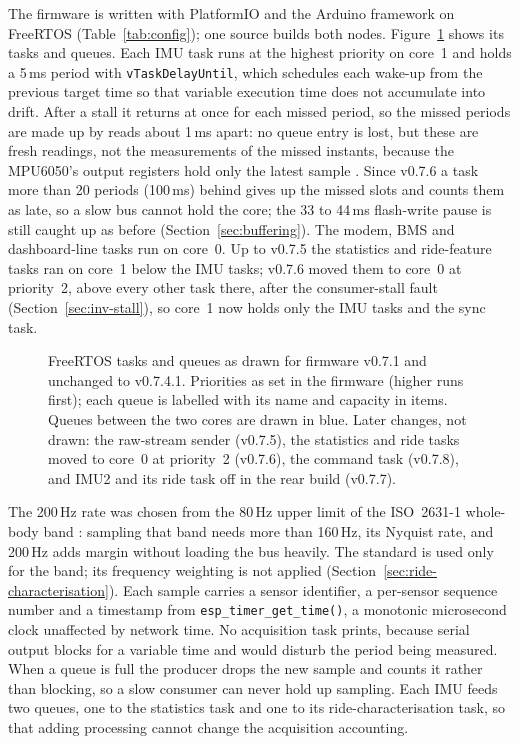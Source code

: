 The firmware is written with PlatformIO and the Arduino framework on FreeRTOS (Table~\ref{tab:config}); one source builds both nodes. Figure~\ref{fig:task-architecture} shows its tasks and queues. Each IMU task runs at the highest priority on core~1 and holds a 5\,ms period with \texttt{vTaskDelayUntil}, which schedules each wake-up from the previous target time so that variable execution time does not accumulate into drift. After a stall it returns at once for each missed period, so the missed periods are made up by reads about 1\,ms apart: no queue entry is lost, but these are fresh readings, not the measurements of the missed instants, because the MPU6050's output registers hold only the latest sample \cite{invensense2012rm}. Since v0.7.6 a task more than 20 periods (100\,ms) behind gives up the missed slots and counts them as late, so a slow bus cannot hold the core; the 33 to 44\,ms flash-write pause is still caught up as before (Section~\ref{sec:buffering}). The modem, BMS and dashboard-line tasks run on core~0. Up to v0.7.5 the statistics and ride-feature tasks ran on core~1 below the IMU tasks; v0.7.6 moved them to core~0 at priority~2, above every other task there, after the consumer-stall fault (Section~\ref{sec:inv-stall}), so core~1 now holds only the IMU tasks and the sync task.

\begin{figure}[htbp]
\centering

\caption[FreeRTOS tasks and queues as drawn for firmware v0.7.1 and unchanged to v0.7.4.1]{FreeRTOS tasks and queues as drawn for firmware v0.7.1 and unchanged to v0.7.4.1. Priorities as set in the firmware (higher runs first); each queue is labelled with its name and capacity in items. Queues between the two cores are drawn in blue. Later changes, not drawn: the raw-stream sender (v0.7.5), the statistics and ride tasks moved to core~0 at priority~2 (v0.7.6), the command task (v0.7.8), and IMU2 and its ride task off in the rear build (v0.7.7).}
\label{fig:task-architecture}
\end{figure}

The 200\,Hz rate was chosen from the 80\,Hz upper limit of the ISO~2631-1 whole-body band \cite{iso2631}: sampling that band needs more than 160\,Hz, its Nyquist rate, and 200\,Hz adds margin without loading the bus heavily. The standard is used only for the band; its frequency weighting is not applied (Section~\ref{sec:ride-characterisation}). Each sample carries a sensor identifier, a per-sensor sequence number and a timestamp from \texttt{esp\_timer\_get\_time()}, a monotonic microsecond clock unaffected by network time. No acquisition task prints, because serial output blocks for a variable time and would disturb the period being measured. When a queue is full the producer drops the new sample and counts it rather than blocking, so a slow consumer can never hold up sampling. Each IMU feeds two queues, one to the statistics task and one to its ride-characterisation task, so that adding processing cannot change the acquisition accounting.


